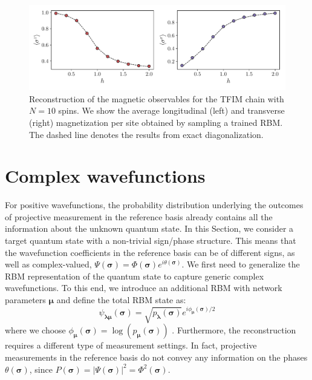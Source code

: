 \documentclass[submission, Phys, hidelnks]{SciPost}
\begin{document}
\begin{figure}[htb]
    \centering{}
    \includegraphics[width=\columnwidth, trim={0 15 0 0}, clip]{obs.pdf}
    \caption{\label{tfim_magn} Reconstruction of the magnetic observables for the TFIM chain with $N=10$ spins. We show the average longitudinal (left) and transverse (right) magnetization per site obtained by sampling a trained RBM. The dashed line denotes the results from exact diagonalization.}
\end{figure}


\section{Complex wavefunctions}
\label{sec:complex}
For positive wavefunctions, the probability distribution underlying the outcomes of projective measurement in the reference basis already contains all the information about the unknown quantum state. In this Section, we consider a target quantum state with a non-trivial sign/phase structure. This means that the wavefunction coefficients in the reference basis can be of different signs, as well as complex-valued, $\Psi(\bm{\sigma})=\Phi(\bm{\sigma})e^{i\theta(\bm{\sigma})}$. We first need to generalize the RBM representation of the quantum state to capture generic complex wavefunctions. To this end, we introduce an additional RBM with network parameters $\bm{\mu}$ and define the total RBM state as:
\begin{equation}
    \psi_{\bm{\lambda} \bm{\mu}} (\bm{\sigma})= \sqrt{p_{\bm{\lambda}} (\bm{\sigma})} e^{i \phi_{\bm{\mu}} (\bm{\sigma})/2}
\end{equation}
where we choose $\phi_{\bm{\mu}}(\bm{\sigma}) = \log (p_{\bm{\mu}} (\bm{\sigma}))$ \cite{torlai2018tomography}. Furthermore, the reconstruction requires a different type of measurement settings. In fact, projective measurements in the reference basis do not convey any information on the phases $\theta(\bm{\sigma})$, since $P(\bm{\sigma})=|\Psi(\bm{\sigma})|^2=\Phi^2(\bm{\sigma})$.
\end{document}
